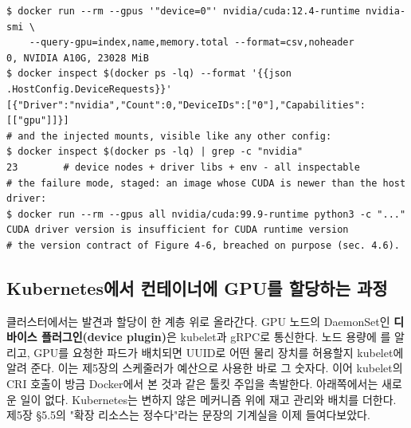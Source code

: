 \begin{terminalbox}
\begin{Verbatim}[breaklines=true,breakanywhere=true,fontsize=\small,formatcom=\color{tbbtermfg},codes=\tbbcodeactive]
$ docker run --rm --gpus '"device=0"' nvidia/cuda:12.4-runtime nvidia-smi \
    --query-gpu=index,name,memory.total --format=csv,noheader
0, NVIDIA A10G, 23028 MiB
$ docker inspect $(docker ps -lq) --format '{{json .HostConfig.DeviceRequests}}'
[{"Driver":"nvidia","Count":0,"DeviceIDs":["0"],"Capabilities":[["gpu"]]}]
# and the injected mounts, visible like any other config:
$ docker inspect $(docker ps -lq) | grep -c "nvidia"
23        # device nodes + driver libs + env - all inspectable
# the failure mode, staged: an image whose CUDA is newer than the host driver:
$ docker run --rm --gpus all nvidia/cuda:99.9-runtime python3 -c "..."
CUDA driver version is insufficient for CUDA runtime version
# the version contract of Figure 4-6, breached on purpose (sec. 4.6).
\end{Verbatim}
\end{terminalbox}

\subsection*{Kubernetes에서 컨테이너에 GPU를 할당하는 과정}

클러스터에서는 발견과 할당이 한 계층 위로 올라간다. GPU 노드의 DaemonSet인 \textbf{디바이스 플러그인(device plugin)}은 kubelet과 gRPC로 통신한다. 노드 용량에 를 알리고, GPU를 요청한 파드가 배치되면 UUID로 어떤 물리 장치를 허용할지 kubelet에 알려 준다. 이는 제5장의 스케줄러가 예산으로 사용한 바로 그 숫자다. 이어 kubelet의 CRI 호출이 방금 Docker에서 본 것과 같은 툴킷 주입을 촉발한다. 아래쪽에서는 새로운 일이 없다. Kubernetes는 변하지 않은 메커니즘 위에 재고 관리와 배치를 더한다. 제5장 §5.5의 "확장 리소스는 정수다"라는 문장의 기계실을 이제 들여다보았다.

